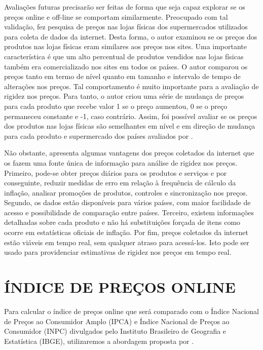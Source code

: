 \documentclass[twoside,a4paper,11pt]{report}
\begin{document}
Avaliações futuras precisarão ser feitas de forma que seja capaz explorar se os preços online e off-line se comportam similarmente. Preocupado com tal validação, \citet{cavallo2010scraped} fez pesquisa de preços nas lojas físicas dos supermercados utilizados para coleta de dados da internet. Desta forma, o autor examinou se os preços dos produtos nas lojas físicas eram similares aos preços nos sites. Uma importante característica é que um alto percentual de produtos vendidos nas lojas físicas também era comercializado nos sites em todos os países. O autor comparou os preços tanto em termo de nível quanto em tamanho e intervalo de tempo de alterações nos preços. Tal comportamento é muito importante para a avaliação de rigidez nos preços. Para tanto, o autor criou uma série de mudança de preços para cada produto que recebe valor 1 se o preço aumentou, 0 se o preço permaneceu constante e -1, caso contrário.  Assim, foi possível avaliar se os preços dos produtos nas lojas físicas são semelhantes em nível e em direção de mudança para cada produto e supermercado dos países avaliados por \citet{cavallo2010scraped}.

Não obstante, \citet{cavallo2010scraped} apresenta algumas vantagens dos preços coletados da internet que os fazem uma fonte única de informação para análise de rigidez nos preços. Primeiro, pode-se obter preços diários para os produtos e serviços e por conseguinte, reduzir medidas de erro em relação à frequência de cálculo da inflação, analisar promoções de produtos, controles e sincronização nos preços. Segundo, os dados estão disponíveis para vários países, com maior facilidade de acesso e possibilidade de comparação entre países. Terceiro, existem informações detalhadas sobre cada produto e não há substituições forçada de itens como ocorre em estatísticas oficiais de inflação. Por fim, preços coletados da internet estão viáveis em tempo real, sem qualquer atraso para acessá-los. Isto pode ser usado para providenciar estimativas de rigidez nos preços em tempo real.
  
\section*{ÍNDICE DE PREÇOS ONLINE}
  
Para calcular o índice de preços online que será comparado com o Índice Nacional de Preços ao Consumidor Amplo (IPCA) e Índice Nacional de Preços ao Consumidor (INPC) divulgados pelo Instituto Brasileiro de Geografia e Estatística (IBGE), utilizaremos a abordagem proposta por \citet{cavallo2010scraped}.
  
\end{document}
